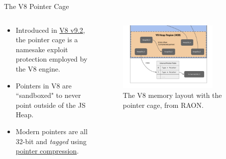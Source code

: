 \begin{frame}{The V8 Pointer Cage}
    \begin{columns}
        \begin{column}{0.35\textwidth}
            \begin{itemize}
                \item Introduced in \href{https://v8.dev/blog/v8-release-92}{\color{pink}V8 v9.2}, the pointer cage is a namesake exploit protection employed by the V8 engine.
                \item Pointers in V8 are ``sandboxed" to never point outside of the JS Heap. 
                \item Modern pointers are all 32-bit and \textit{tagged} using \href{https://v8.dev/blog/pointer-compression}{\color{pink}pointer compression}.
            \end{itemize}
        \end{column}
        \begin{column}{0.65\textwidth}
            \begin{figure}
                \centering
                \includegraphics[width=0.80\textwidth]{images/v8-ptr-cage.png}
                \caption{The V8 memory layout with the pointer cage, from RAON.}
                \label{fig:v8-memory-layout}
            \end{figure}
        \end{column}
    \end{columns}
\end{frame}
